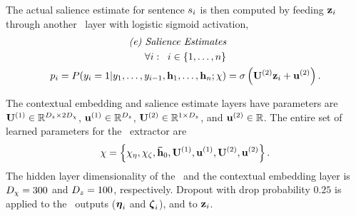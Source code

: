 The actual salience
estimate for sentence $s_i$ is then computed by feeding $\mathbf{z}_i$
through another \feedforward~layer with logistic sigmoid activation,
\begin{align}
    \textit{(e) Salience Estimates} & \nonumber\\
    \forall i : \;\; i \in \{1,\ldots,n\}& \nonumber \\
 p_i = P(y_i =1|y_1,\ldots,y_{i-1}, \mathbf{h}_1,\ldots,\mathbf{h}_n; \chi) &= \sigma\left(\mathbf{U}^{(2)}\mathbf{z}_i + \mathbf{u}^{(2)}  \right).
\end{align}

The contextual embedding and salience estimate layers have parameters are $\mathbf{U}^{(1)} \in \mathbb{R}^{{D_{z}} \times 2 {D_{\chi}}}$, $\mathbf{u}^{(1)} \in \mathbb{R}^{{D_{z}}}$, $\mathbf{U}^{(2)} \in \mathbb{R}^{1 \times {D_{z}}}$, and $\mathbf{u}^{(2)}\in \mathbb{R}$.
The entire set of learned parameters for the \clext~extractor are
\[
    \chi = \left\{ 
    \chi_\eta, \chi_\zeta,
    \boldsymbol{\bar{\mathbf{h}}}_0,
    \mathbf{U}^{(1)}, \mathbf{u}^{(1)}, \mathbf{U}^{(2)}, \mathbf{u}^{(2)}\right\}.
\]
The hidden layer dimensionality of the \gru~and the contextual embedding layer
is 
${D_{\chi}} = 300$ and ${D_{z}}=100$, respectively.
Dropout with drop probability $0.25$ is applied to the \gru~outputs
($\boldsymbol{\eta}_i$ and $\boldsymbol{\zeta}_i$),   and to $\mathbf{z}_i$.



